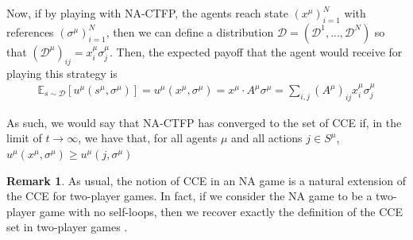 \documentclass{article}
\theoremstyle{definition}
\newtheorem*{remark}{Remark}
\newcommand{\xmu}{x^{\mu}}
\newcommand{\refmu}{\sigma^{\mu}}
\begin{document}
  Now, if by playing with NA-CTFP, the
  agents reach state $(\xmu)_{i = 1}^N$ with references
  $(\refmu)_{i = 1}^N$, then we can define a distribution $\mathcal{D} =
  (\mathcal{D}^1, ..., \mathcal{D}^N)$ so that
  $(\mathcal{D}^\mu)_{ij} = \xmu_i \refmu_j$. Then, the expected
  payoff that the agent would receive for playing this strategy is
%
  \begin{align*}
    \mathbb{E}_{s \sim \mathcal{D}}[u^\mu (s^\mu, \refmu)] = u^\mu (\xmu, \refmu) = \xmu \cdot A^\mu \refmu = \sum_{i, j} (A^\mu)_{ij} \xmu_i \refmu_j \nonumber 
  \end{align*}

  As such, we would say that NA-CTFP has converged to the set of CCE if, in the limit of $t
  \rightarrow \infty$, we have that, for all agents $\mu$ and all actions $j \in S^\mu$,
  $u^\mu (\xmu, \refmu) \geq u^\mu(j, \refmu)$

  \begin{remark}
    As usual, the notion of CCE in an NA game is a natural extension of the CCE for two-player
    games. In fact, if we consider the NA game to be a two-player game with no self-loops, then
    we recover exactly the definition of the CCE set in two-player games \cite{Ostrovski2014}.
  \end{remark}
\end{document}

